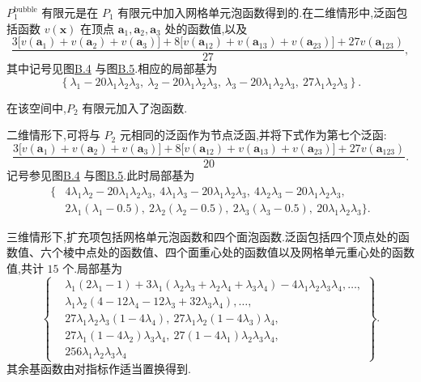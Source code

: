 \begin{example}\label{ex:appendix-b-41}
$P_1^{\mathrm{bubble}}$ 有限元是在 $P_1$ 有限元中加入网格单元泡函数得到的.在二维情形中,泛函包括函数 $v(\bm x)$ 在顶点 $\bm a_1,\bm a_2,\bm a_3$ 处的函数值,以及
\[
 \frac{
 3\bigl[v(\bm a_1)+v(\bm a_2)+v(\bm a_3)\bigr]
 +8\bigl[v(\bm a_{12})+v(\bm a_{13})+v(\bm a_{23})\bigr]
 +27v(\bm a_{123})}{27},
\]
其中记号见图\hyperref[fig:appendix-b-4]{B.4} 与图\hyperref[fig:appendix-b-5]{B.5}.相应的局部基为
\[
 \left\{
 \lambda_1-20\lambda_1\lambda_2\lambda_3,\
 \lambda_2-20\lambda_1\lambda_2\lambda_3,\
 \lambda_3-20\lambda_1\lambda_2\lambda_3,\
 27\lambda_1\lambda_2\lambda_3
 \right\}.
\]
\end{example}

\begin{example}\label{ex:appendix-b-42}
在该空间中,$P_2$ 有限元加入了泡函数.

二维情形下,可将与 $P_2$ 元相同的泛函作为节点泛函,并将下式作为第七个泛函:
\[
 \frac{
 3\bigl[v(\bm a_1)+v(\bm a_2)+v(\bm a_3)\bigr]
 +8\bigl[v(\bm a_{12})+v(\bm a_{13})+v(\bm a_{23})\bigr]
 +27v(\bm a_{123})}{20}.
\]
记号参见图\hyperref[fig:appendix-b-4]{B.4} 与图\hyperref[fig:appendix-b-5]{B.5}.此时局部基为
\[
 \begin{aligned}
 \{&
 4\lambda_1\lambda_2-20\lambda_1\lambda_2\lambda_3,\
 4\lambda_1\lambda_3-20\lambda_1\lambda_2\lambda_3,\
 4\lambda_2\lambda_3-20\lambda_1\lambda_2\lambda_3,\\
 &2\lambda_1(\lambda_1-0.5),\
 2\lambda_2(\lambda_2-0.5),\
 2\lambda_3(\lambda_3-0.5),\
 20\lambda_1\lambda_2\lambda_3
 \}.
 \end{aligned}
\]

三维情形下,扩充项包括网格单元泡函数和四个面泡函数.泛函包括四个顶点处的函数值、六个棱中点处的函数值、四个面重心处的函数值以及网格单元重心处的函数值,共计 $15$ 个.局部基为
\[
 \left\{
 \begin{aligned}
 &\lambda_1(2\lambda_1-1)
 +3\lambda_1(\lambda_2\lambda_3+\lambda_2\lambda_4+\lambda_3\lambda_4)
 -4\lambda_1\lambda_2\lambda_3\lambda_4,\ldots,\\
 &\lambda_1\lambda_2(4-12\lambda_4-12\lambda_3
 +32\lambda_3\lambda_4),\ldots,\\
 &27\lambda_1\lambda_2\lambda_3(1-4\lambda_4),\
 27\lambda_1\lambda_2(1-4\lambda_3)\lambda_4,\\
 &27\lambda_1(1-4\lambda_2)\lambda_3\lambda_4,\
 27(1-4\lambda_1)\lambda_2\lambda_3\lambda_4,\\
 &256\lambda_1\lambda_2\lambda_3\lambda_4
 \end{aligned}
 \right\}.
\]
其余基函数由对指标作适当置换得到.
\end{example}
\index{有限元!泡函数扩充}

